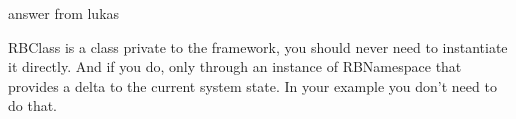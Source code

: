 \documentclass[a4paper,10pt,twoside]{book}
\begin{document}
answer from lukas
\begin{code}{}
RBClass is a class private to the framework, you should never need to
instantiate it directly. And if you do, only through an instance of
RBNamespace that provides a delta to the current system state. In your
example you don't need to do that.

\end{code}

\ifx\wholebook\relax\else
\end{document}
